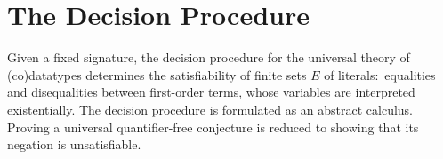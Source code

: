 \documentclass[letter]{article}
\newcommand\MU{\vvthinspace\mu\vvthinspace}
\theoremstyle{plain}
\theoremstyle{definition}
\newcommand\afterDot{\;} %
\newcommand\Sig{\mathrm{\Sigma}}
\newcommand\keyw[1]{\textbf{#1}}
\newcommand\const[1]{\textsf{#1}}
\newcommand\ty[1]{\textit{#1}}
\newcommand{\Ec}{E}
\newcommand{\JJJJ}{\mathcal{\!J\!}}
\newcommand{\thD}{\mathcalx{DC}}
\newcommand\vvthinspace{\kern+0.041667em}
\newcommand\vthinspace{\kern+0.083333em}
\begin{document}
%
%

\section{The Decision Procedure} %
\label{sec:the-decision-procedure}

Given a fixed signature, %
the decision procedure for the universal theory of (co)data\-types %
determines the
satisfiability of finite sets $\Ec$ of literals:\ equalities
and disequalities between first-order terms, %
whose variables are interpreted existentially.
The decision procedure is formulated as an %
abstract calculus.
Proving a universal quantifier-free conjecture is reduced to showing that
its negation is unsatisfiable. 
\end{document}
